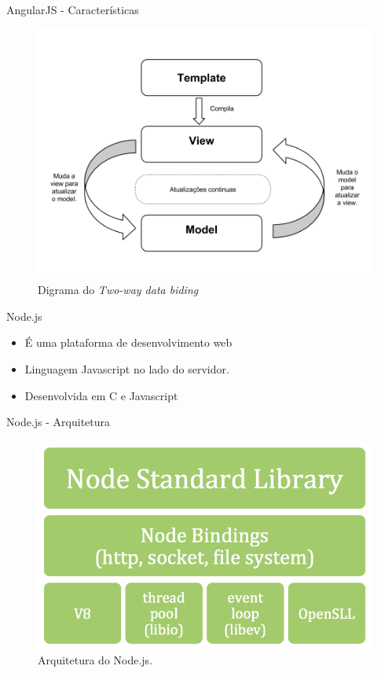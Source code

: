 \documentclass{beamer}
\newlength{\wideitemsep}
\let\olditem\item
\renewcommand{\item}{\setlength{\itemsep}{\wideitemsep}\olditem}
\begin{document}
\begin{frame}{AngularJS - Características}
    \begin{figure}[htb]
    \centering
    \includegraphics[scale=0.20]{../images/Two_way_databiding_diagram.png}
    \caption{Digrama do \textit{Two-way data biding}}
    \label{fig: twdb}
    \end{figure}
\end{frame}

\begin{frame}{Node.js}
    \begin{itemize}
        \item É uma plataforma de desenvolvimento web
        \item Linguagem Javascript
no lado do servidor.
        \item Desenvolvida em C e Javascript
    \end{itemize}
\end{frame}

\begin{frame}{Node.js - Arquitetura}
    \begin{figure}[htb]
    \centering
    \includegraphics[scale=0.35]{../images/node_platform.png}
    \caption{Arquitetura do Node.js.}
    \label{fig: node_plat}
    \end{figure}
\end{frame}
\end{document}
